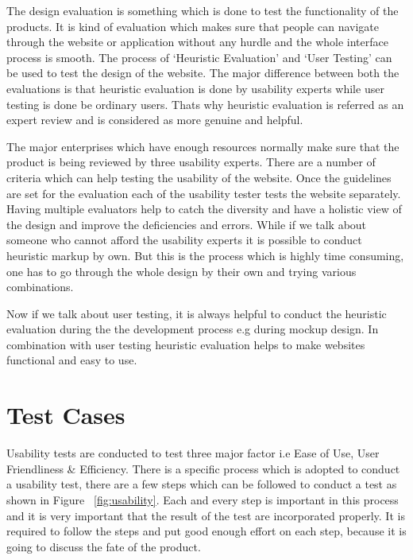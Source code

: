The design evaluation is something which is done to test the functionality of the products. It is kind of evaluation which makes sure that people can navigate through the website or application without any hurdle and the whole interface process is smooth. The process of `Heuristic Evaluation' and `User Testing' can be used to test the design of the website. The major difference between both the evaluations is that heuristic evaluation is done by usability experts while user testing is done be ordinary users. Thats why heuristic evaluation is referred as an expert review and is considered as more genuine and helpful. \par
The major enterprises which have enough resources normally make sure that the product is being reviewed by three usability experts. There are a number of criteria which can help testing the usability of the website. Once the guidelines are set for the evaluation each of the usability tester tests the website separately. Having multiple evaluators help to catch the diversity and have a holistic view of the design and improve the deficiencies and errors. While if we talk about someone who cannot afford the usability experts it is possible to conduct heuristic markup by own. But this is the process which is highly time consuming, one has to go through the whole design by their own and trying various combinations.\par
Now if we talk about user testing, it is always helpful to conduct the heuristic evaluation during the the development process e.g during mockup design. In combination with user testing heuristic  evaluation helps to make websites functional and easy to use. ~\cite{test}
\section{Test Cases} 
Usability tests are conducted to test three major factor i.e Ease of Use, User Friendliness \& Efficiency. 
There is a specific process which is adopted to conduct a usability test, there are a few steps which can be followed to conduct a test as shown in Figure ~\ref{fig:usability}.
Each and every step is important in this process and it is very important that the result of the test are incorporated properly. It is required to follow the steps and put good enough effort on each step, because it is going to discuss the fate of the product. 

